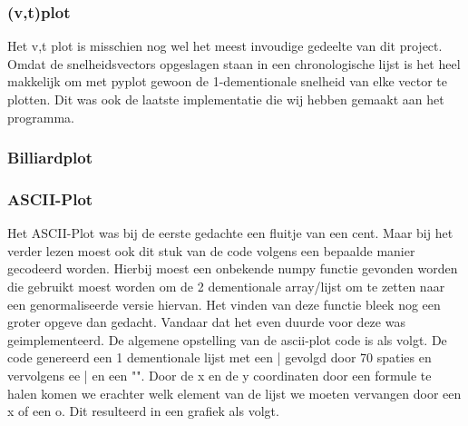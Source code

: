 \documentclass{article}
\begin{document}
\subsubsection{(v,t)plot}
Het v,t plot is misschien nog wel het meest invoudige gedeelte van dit project. Omdat de snelheidsvectors opgeslagen staan in een chronologische lijst is het heel makkelijk om met pyplot gewoon de 1-dementionale snelheid van elke vector te plotten. Dit was ook de laatste implementatie die wij hebben gemaakt aan het programma. 
\subsubsection{Billiardplot}

\subsubsection{ASCII-Plot}
Het ASCII-Plot was bij de eerste gedachte een fluitje van een cent. Maar bij het verder lezen moest ook dit stuk van de code volgens een bepaalde manier gecodeerd worden. Hierbij moest een onbekende numpy functie gevonden worden die gebruikt moest worden om de 2 dementionale array/lijst om te zetten naar een genormaliseerde versie hiervan. Het vinden van deze functie bleek nog een groter opgeve dan gedacht. Vandaar dat het even duurde voor deze was geimplementeerd. 
De algemene opstelling van de ascii-plot code is als volgt. De code genereerd een 1 dementionale lijst met een | gevolgd door 70 spaties en vervolgens ee | en  een "\n". Door de x en de y coordinaten door een formule te halen komen we erachter welk element van de lijst we moeten vervangen door een x of een o. Dit resulteerd in een grafiek als volgt. 
\end{document}
